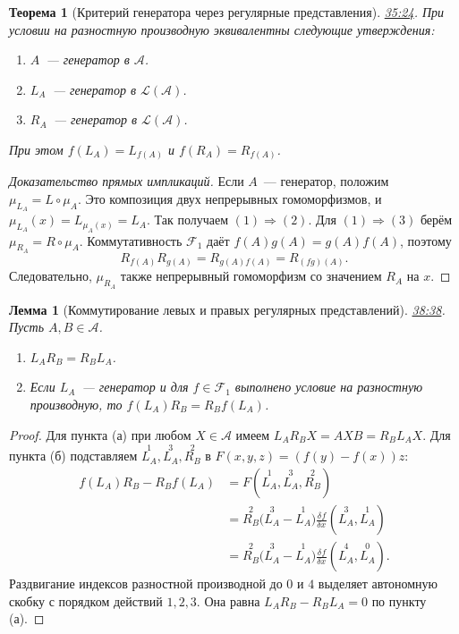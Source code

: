 \documentclass[11pt,a4paper]{article}
\theoremstyle{plain}
\newtheorem{theorem}{Теорема}[section]
\newtheorem*{auxlemma}{Лемма}
\theoremstyle{definition}
\newcommand{\ddiff}[2][]{\frac{\delta^{#1}#2}{\delta x^{#1}}}
\newcommand{\at}[3]{\href{https://www.youtube.com/watch?v=#1&t=#2s}{#3}}
\begin{document}
\begin{theorem}[Критерий генератора через регулярные представления]
\at{8kQuUxC-VVg}{2124}{35:24}.
При условии на разностную производную эквивалентны
следующие утверждения:
\begin{enumerate}
 \item $A$~--- генератор в $\mathcal A$.
 \item $L_A$~--- генератор в $\mathcal L(\mathcal A)$.
 \item $R_A$~--- генератор в $\mathcal L(\mathcal A)$.
\end{enumerate}
При этом $f(L_A)=L_{f(A)}$ и $f(R_A)=R_{f(A)}$.
\end{theorem}
\begin{proof}[Доказательство прямых импликаций]
Если $A$~--- генератор, положим $\mu_{L_A}=L\circ\mu_A$.
Это композиция двух непрерывных гомоморфизмов, и
$\mu_{L_A}(x)=L_{\mu_A(x)}=L_A$. Так получаем
$(1)\Rightarrow(2)$. Для $(1)\Rightarrow(3)$ берём
$\mu_{R_A}=R\circ\mu_A$. Коммутативность $\mathcal F_1$
даёт $f(A)g(A)=g(A)f(A)$, поэтому
\[
 R_{f(A)}R_{g(A)}=R_{g(A)f(A)}=R_{(fg)(A)}.
\]
Следовательно, $\mu_{R_A}$ также непрерывный
гомоморфизм со значением $R_A$ на $x$.
\end{proof}

\begin{auxlemma}[Коммутирование левых и правых регулярных представлений]
\at{8kQuUxC-VVg}{2318}{38:38}.
Пусть $A,B\in\mathcal A$.
\begin{enumerate}
 \item[(а)] $L_A R_B=R_B L_A$.
 \item[(б)] Если $L_A$~--- генератор и для $f\in\mathcal F_1$
 выполнено условие на разностную производную, то
 $f(L_A)R_B=R_B f(L_A)$.
\end{enumerate}
\end{auxlemma}
\begin{proof}
Для пункта (а) при любом $X\in\mathcal A$ имеем
$L_A R_B X=AXB=R_B L_A X$.
Для пункта (б) подставляем
$\overset{1}{L_A},\overset{3}{L_A},\overset{2}{R_B}$
в $F(x,y,z)=(f(y)-f(x))z$:
\[
 \begin{aligned}
 f(L_A)R_B-R_B f(L_A)
 &=F(\overset{1}{L_A},\overset{3}{L_A},\overset{2}{R_B})\\
 &=\overset{2}{R_B}\bigl(\overset{3}{L_A}-\overset{1}{L_A}\bigr)
    \ddiff{f}(\overset{3}{L_A},\overset{1}{L_A})\\
 &=\boxed{\overset{2}{R_B}
       \bigl(\overset{3}{L_A}-\overset{1}{L_A}\bigr)}
    \ddiff{f}(\overset{4}{L_A},\overset{0}{L_A}).
 \end{aligned}
\]
Раздвигание индексов разностной производной до $0$ и $4$
выделяет автономную скобку с порядком действий $1,2,3$.
Она равна $L_A R_B-R_B L_A=0$ по пункту (а).
\end{proof}
\end{document}
